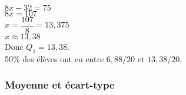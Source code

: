 $ 8x - 32 = 75 $ \\

$ 8x = 107 $ \\

$ x = \dfrac{107}{8} = 13,375 $ \\

$ x \approx 13,38 $ \\

Donc $Q_1 = 13,38$. \\

50\% des élèves ont eu entre $6,88/20$ et $13,38/20$.

\newpage 

\subsubsection{Moyenne et écart-type}

 



